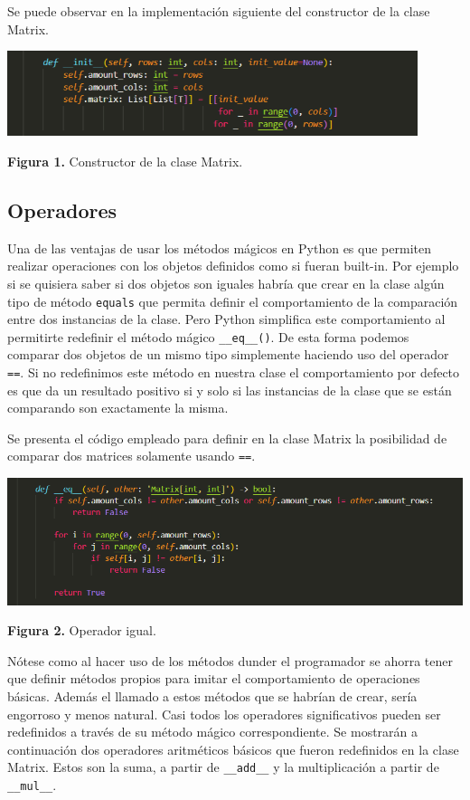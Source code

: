 \documentclass[10pt]{article} %
\newcommand{\csl}[1]{\colorbox{backcolour}{\texttt{#1}}}
\newcommand{\imgcaption}[2]{\tiny \textbf{Figura #1.} #2.}
\newcommand{\mgc}[2][]{\colorbox{backcolour}{\texttt{\_\_#2\_\_#1}}}
\begin{document}
Se puede observar en la implementaci\'on siguiente del constructor de la clase Matrix.

\begin{center}
	\includegraphics[width=12cm]{init.png}
	
	\imgcaption{1}{Constructor de la clase Matrix}
\end{center}


\subsection{Operadores}

Una de las ventajas de usar los m\'etodos  m\'agicos en Python es que permiten realizar operaciones con los objetos definidos como si fueran built-in. Por ejemplo si se quisiera saber si dos objetos son iguales habr\'ia que crear en la clase alg\'un tipo de m\'etodo \csl{equals} que permita definir el comportamiento de la comparaci\'on entre dos instancias de la clase. Pero Python simplifica este comportamiento al permitirte redefinir el m\'etodo m\'agico \mgc[()]{eq}. De esta forma podemos comparar dos objetos de un mismo tipo simplemente haciendo uso del operador \csl{==}. Si no redefinimos este m\'etodo en nuestra clase el comportamiento por defecto es que da un resultado positivo si y solo si las instancias de la clase que se est\'an comparando son exactamente la misma.

Se presenta el c\'odigo empleado para definir en la clase Matrix la posibilidad de comparar dos matrices solamente usando \csl{==}.

\begin{center}
	\includegraphics[width=14cm]{eq.png} 
	
	\imgcaption{2}{Operador igual}
\end{center}


N\'otese como al hacer uso de los m\'etodos dunder el programador se ahorra tener que definir m\'etodos propios para imitar el comportamiento de operaciones b\'asicas. Adem\'as el llamado a estos m\'etodos que se habr\'ian de crear, ser\'ia engorroso y menos natural. Casi todos los operadores significativos pueden ser redefinidos a trav\'es de su m\'etodo m\'agico correspondiente. Se mostrar\'an a continuaci\'on dos operadores aritm\'eticos b\'asicos que fueron redefinidos en la clase Matrix. Estos son la suma, a partir de \mgc{add} y la multiplicaci\'on a partir de \mgc{mul}.
\end{document}

